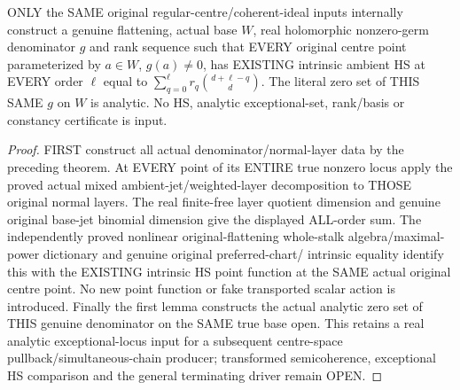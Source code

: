 \begin{theorem}
\label{hir:original-real-analytic-denominator-entire-intrinsic-hs-convolution}
\leanok
ONLY the SAME original regular-centre/coherent-ideal inputs internally
construct a genuine flattening, actual base $W$, real holomorphic nonzero-germ
denominator $g$ and rank sequence such that EVERY original centre point
parameterized by $a\in W$, $g(a)\ne0$, has EXISTING intrinsic ambient HS at
EVERY order $\ell$ equal to
$\sum_{q=0}^{\ell}r_q\binom{d+\ell-q}{d}$. The literal zero set of THIS SAME
$g$ on $W$ is analytic. No HS, analytic exceptional-set, rank/basis or
constancy certificate is input.
\end{theorem}
\begin{proof}
FIRST construct all actual denominator/normal-layer data by the preceding
theorem. At EVERY point of its ENTIRE true nonzero locus apply the proved
actual mixed ambient-jet/weighted-layer decomposition to THOSE original
normal layers. The real finite-free layer quotient dimension and genuine
original base-jet binomial dimension give the displayed ALL-order sum.
The independently proved nonlinear original-flattening whole-stalk
algebra/maximal-power dictionary and genuine original preferred-chart/
intrinsic equality identify this with the EXISTING intrinsic HS point
function at the SAME actual original centre point. No new point function
or fake transported scalar action is introduced. Finally the first lemma
constructs the actual analytic zero set of THIS genuine denominator on
the SAME true base open. This retains a real analytic exceptional-locus
input for a subsequent centre-space pullback/simultaneous-chain producer;
transformed semicoherence, exceptional HS comparison and the general
terminating driver remain OPEN.
\end{proof}

